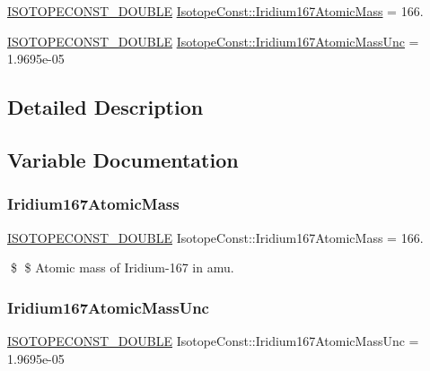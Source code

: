 \begin{DoxyCompactItemize}
\item 
\mbox{\hyperlink{group___isotope_const-_macros_ga8f45a7272ce02c0b4c65c44636ed719a}{I\+S\+O\+T\+O\+P\+E\+C\+O\+N\+S\+T\+\_\+\+D\+O\+U\+B\+LE}} \mbox{\hyperlink{group___isotope_const-_iridium-_ir167_ga3543eaa452e04ceb3e13e59d83c56465}{Isotope\+Const\+::\+Iridium167\+Atomic\+Mass}} = 166.
\item 
\mbox{\hyperlink{group___isotope_const-_macros_ga8f45a7272ce02c0b4c65c44636ed719a}{I\+S\+O\+T\+O\+P\+E\+C\+O\+N\+S\+T\+\_\+\+D\+O\+U\+B\+LE}} \mbox{\hyperlink{group___isotope_const-_iridium-_ir167_ga38dc5d408d931ec941001dd98cf1aff5}{Isotope\+Const\+::\+Iridium167\+Atomic\+Mass\+Unc}} = 1.\+9695e-\/05
\end{DoxyCompactItemize}


\subsection{Detailed Description}


\subsection{Variable Documentation}
\mbox{\label{group___isotope_const-_iridium-_ir167_ga3543eaa452e04ceb3e13e59d83c56465}} 
\subsubsection{\texorpdfstring{Iridium167\+Atomic\+Mass}{Iridium167AtomicMass}}
{\footnotesize\ttfamily \mbox{\hyperlink{group___isotope_const-_macros_ga8f45a7272ce02c0b4c65c44636ed719a}{I\+S\+O\+T\+O\+P\+E\+C\+O\+N\+S\+T\+\_\+\+D\+O\+U\+B\+LE}} Isotope\+Const\+::\+Iridium167\+Atomic\+Mass = 166.}

\$ \$ Atomic mass of Iridium-\/167 in amu. \mbox{\label{group___isotope_const-_iridium-_ir167_ga38dc5d408d931ec941001dd98cf1aff5}} 
\subsubsection{\texorpdfstring{Iridium167\+Atomic\+Mass\+Unc}{Iridium167AtomicMassUnc}}
{\footnotesize\ttfamily \mbox{\hyperlink{group___isotope_const-_macros_ga8f45a7272ce02c0b4c65c44636ed719a}{I\+S\+O\+T\+O\+P\+E\+C\+O\+N\+S\+T\+\_\+\+D\+O\+U\+B\+LE}} Isotope\+Const\+::\+Iridium167\+Atomic\+Mass\+Unc = 1.\+9695e-\/05}

